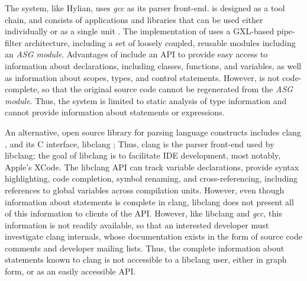 The {\gfourre} system, like Hylian, uses {\em gcc} as its parser
front-end. {\gfourre} is designed as a tool chain, and consists 
of applications and libraries that can be used either individually 
or as a single unit \cite{kraft05-wcre,kraft06-ist}.
The implementation of {\gfourre} uses  a GXL-based pipe-filter 
architecture, including a set of loosely coupled, reusable 
modules including an {\em ASG module}.
Advantages of {\gfourre} include an API to provide easy access to
information about declarations, including classes, functions,
and variables, as well as information about scopes, types, and
control statements. 
However, {\gfourre} is not code-complete, so that 
the original source code cannot be regenerated from
the {\em ASG module}. 
Thus, the {\gfourre} system is limited to static analysis of
type information and cannot provide information about statements
or expressions.

An alternative, open source library for parsing {\CPP} language
constructs includes clang \cite{www-clang}, and its C interface, 
libclang \cite{www-libclang};
Thus, clang is the parser front-end used by libclang; 
the goal of libclang is to facilitate IDE development,
most notably, Apple's XCode.  The libclang API can
track variable declarations, provide syntax highlighting, code 
completion, symbol renaming, and cross-referencing, including 
references to global variables across compilation units. 
However, even though information about statements is complete in
clang, libclang does not present all of this information
to clients of the API.
However, like libclang and {\em gcc}, this information is not 
readily available, so that an interested developer
must investigate clang internals, whose documentation exists in 
the form of source code comments and developer mailing lists.
Thus, the complete information about statements known to clang
is not accessible to a libclang user, either in graph form, or as
an easily accessible API.

